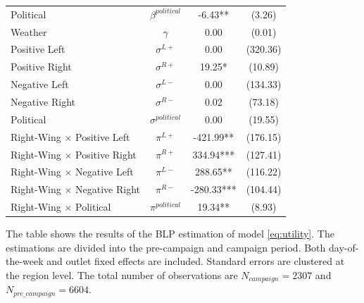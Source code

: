 \documentclass[12pt]{article}
\begin{document}
\begin{table}[p]
\begin{threeparttable}
\begin{tabular}{lccc}
				Political & $\beta^{political}$ & -6.43** & (3.26) \\
				Weather & $\gamma$ & 0.00 & (0.01) \\
				\hline
				Positive Left & $\sigma^{L+}$ & 0.00 & (320.36) \\
				Positive Right & $\sigma^{R+}$ & 19.25* & (10.89) \\
				Negative Left & $\sigma^{L-}$ & 0.00 & (134.33) \\
				Negative Right & $\sigma^{R-}$ & 0.02 & (73.18) \\
				Political & $\sigma^{political}$ & 0.00 & (19.55) \\
				\hline
				Right-Wing $\times$  Positive Left & $\pi^{L+}$ & -421.99** & (176.15) \\
				Right-Wing $\times$  Positive Right & $\pi^{R+}$ & 334.94*** & (127.41) \\
				Right-Wing $\times$  Negative Left & $\pi^{L-}$ & 288.65** & (116.22) \\
				Right-Wing $\times$  Negative Right & $\pi^{R-}$ & -280.33*** & (104.44) \\
				Right-Wing $\times$  Political & $\pi^{political}$ & 19.34** & (8.93) \\
				\hline
				\hline
			\end{tabular}

			\begin{tablenotes}
				\small
				\item \footnotesize{The table shows the results of the BLP estimation of model \ref{eq:utility}. The estimations are divided into the pre-campaign and campaign period. Both day-of-the-week and outlet fixed effects are included. Standard errors are clustered at the region level. The total number of observations are $N_{campaign}=2307$ and  $N_{pre\_campaign}=6604$.}
			\end{tablenotes}
		\end{threeparttable}
	\end{table}
	
	
	
	
	
	
	
\end{document}
